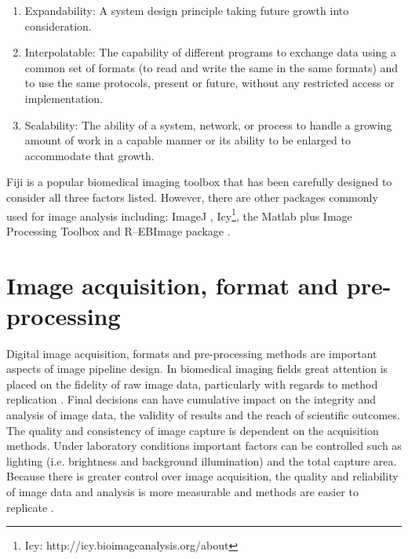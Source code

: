 \begin{enumerate}
\item Expandability: A system design principle taking future growth into consideration.
\item Interpolatable: The capability of different programs to exchange data using a common set of formats (to read and write the same in the same formats) and to use the same protocols, present or future, without any restricted access or implementation.
\item Scalability: The ability of a system, network, or process to handle a growing amount of work in a capable manner or its ability to be enlarged to accommodate that growth.
\end{enumerate}

Fiji \cite{Schindelin2012} is a popular biomedical imaging toolbox that has been carefully designed to consider all three factors listed. However, there are other packages commonly used for image analysis including: ImageJ \cite{Schneider2012}, Icy\footnote{Icy: {http://icy.bioimageanalysis.org/about}}\cite{De2012}, the Matlab plus Image Processing Toolbox \cite{Qidwai2011} and R--EBImage package \cite{Pau2010}.

\section{Image acquisition, format and pre-processing}
Digital image acquisition, formats and pre-processing methods are important aspects of image pipeline design. In biomedical imaging fields great attention is placed on the fidelity of raw image data, particularly with regards to method replication \cite{Pearson2007}. Final decisions can have cumulative impact on the integrity and analysis of image data, the validity of results and the reach of scientific outcomes. The quality and consistency of image capture is dependent on the acquisition methods. Under laboratory conditions important factors can be controlled such as lighting (i.e. brightness and background illumination) and the total capture area. Because there is greater control over image acquisition, the quality and reliability of image data and analysis is more measurable and methods are easier to replicate \cite{North2006}.

